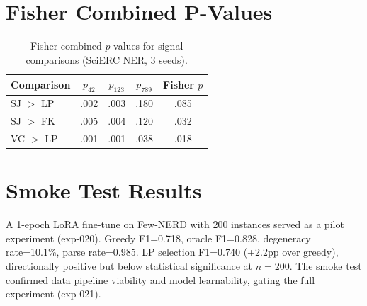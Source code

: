 \documentclass[11pt,a4paper]{article}
\begin{document}
\section{Fisher Combined P-Values}
\label{app:fisher}

\begin{table}[h]
\centering
\small
\caption{Fisher combined $p$-values for signal comparisons (SciERC NER, 3 seeds).}
\label{tab:fisher}
\begin{tabular}{lcccc}
\toprule
\textbf{Comparison} & \textbf{$p_{42}$} & \textbf{$p_{123}$} & \textbf{$p_{789}$} & \textbf{Fisher $p$} \\
\midrule
SJ $>$ LP & .002 & .003 & .180 & .085 \\
SJ $>$ FK & .005 & .004 & .120 & .032 \\
VC $>$ LP & .001 & .001 & .038 & .018 \\
\bottomrule
\end{tabular}
\end{table}

\section{Smoke Test Results}
\label{app:smoke}

A 1-epoch LoRA fine-tune on Few-NERD with 200 instances served as a pilot experiment (exp-020).
Greedy F1=0.718, oracle F1=0.828, degeneracy rate=10.1\%, parse rate=0.985.
LP selection F1=0.740 (+2.2pp over greedy), directionally positive but below statistical significance at $n{=}200$.
The smoke test confirmed data pipeline viability and model learnability, gating the full experiment (exp-021).
\end{document}
